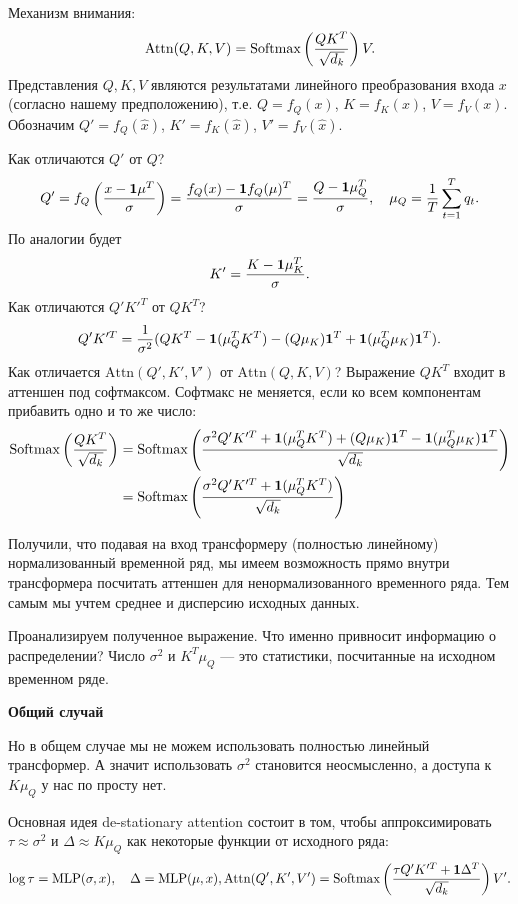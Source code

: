 \documentclass[12pt,fleqn]{article}
\begin{document}
Механизм внимания:
$$
\text{Attn}(Q,K,V)=\text{Softmax}\left({QK^T\over\sqrt{d_k}}\right)V.
$$
Представления $Q,K,V$ являются результатами линейного преобразования входа $x$ (согласно нашему предположению), т.е. $Q=f_Q(x)$, $K=f_K(x)$, $V=f_V(x)$. Обозначим $Q'=f_Q(\widehat x)$, $K'=f_K(\widehat x)$, $V'=f_V(\widehat x)$.

Как отличаются $Q'$ от $Q$?
$$
Q'=f_Q\left({x-\textbf{1}\mu^T\over\sigma}\right)={f_Q(x)-\textbf{1}f_Q(\mu)^T\over\sigma}={Q-\textbf{1}\mu_Q^T\over\sigma},\quad\mu_Q={1\over T}\sum_{t=1}^Tq_t.
$$
По аналогии будет
$$
K'={K-\textbf{1}\mu_K^T\over\sigma}.
$$
Как отличаются $Q'K'^T$ от  $QK^T$?
$$
Q'K'^T={1\over\sigma^2}(QK^T-\textbf{1}(\mu_Q^TK^T)-(Q\mu_K)\textbf{1}^T+\textbf{1}(\mu_Q^T\mu_K)\textbf{1}^T).
$$
Как отличается $\text{Attn}(Q',K',V')$ от $\text{Attn}(Q,K,V)$? Выражение $QK^T$ входит в аттеншен под софтмаксом. Софтмакс не меняется, если ко всем компонентам прибавить одно и то же число:
\begin{align*}
\text{Softmax}\left({QK^T\over\sqrt{d_k}}\right)&=\text{Softmax}\left({\sigma^2Q'K'^T+\textbf{1}(\mu_Q^TK^T)+(Q\mu_K)\textbf{1}^T-\textbf{1}(\mu_Q^T\mu_K)\textbf{1}^T\over\sqrt{d_k}}\right)\\
&=\text{Softmax}\left({\sigma^2Q'K'^T+\textbf{1}(\mu_Q^TK^T)\over\sqrt{d_k}}\right)    
\end{align*}

Получили, что подавая на вход трансформеру (полностью линейному) нормализованный временной ряд, мы имеем возможность прямо внутри трансформера посчитать аттеншен для ненормализованного временного ряда. Тем самым мы учтем среднее и дисперсию исходных данных.

Проанализируем полученное выражение. Что именно привносит информацию о распределении? Число $\sigma^2$ и $K^T\mu_Q$ — это статистики, посчитанные на исходном временном ряде.

\textbf{Общий случай}

Но в общем случае мы не можем использовать полностью линейный трансформер. А значит использовать $\sigma^2$ становится неосмысленно, а доступа к $K\mu_Q$ у нас по просту нет.

Основная идея de-stationary attention состоит в том, чтобы аппроксимировать $\tau\approx\sigma^2$ и $\Delta\approx K\mu_Q$ как некоторые функции от исходного ряда:
$$
\log\tau=\text{MLP}(\sigma,x),\quad\Delta=\text{MLP}(\mu,x),\\
\text{Attn}(Q',K',V')=\text{Softmax}\left({\tau Q'K'^T+\textbf{1}\Delta^T\over\sqrt{d_k}}\right)V'.
$$
\end{document}
